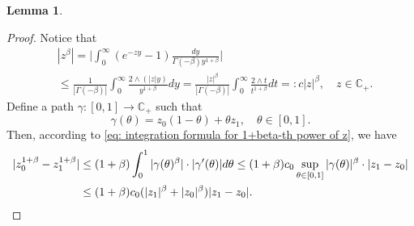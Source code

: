 \documentclass[12pt,oneside,english]{amsart}
\theoremstyle{plain}
\newtheorem{lem}[thm]{Lemma}
\theoremstyle{definition}
\numberwithin{equation}{section}
\begin{document}
{\begin{lem}
\end{lem}
\begin{proof}
    Notice that
\begin{align}
\label{eq: upper bound for beta power of z}
    &|z^{\beta}|
    = \Big|\int_0^\infty (e^{-zy}-1) \frac{dy}{\Gamma(-\beta)y^{1+\beta}}\Big|
    \\&\leq \frac{1}{|\Gamma(-\beta)|}\int_0^\infty \frac{2\wedge (|z|y)}{y^{1+\beta}}dy
    = \frac{|z|^{\beta}}{|\Gamma(-\beta)|}\int_0^\infty \frac{2\wedge t}{t^{1+\beta}}dt =: c |z|^{\beta},
    \quad z\in \mathbb C_+.
\end{align}
    Define a path $\gamma: [0,1] \to \mathbb C_+$ such that
\[
    \gamma(\theta)
    = z_0 (1-\theta) + \theta z_1,
    \quad \theta \in [0,1].
\]
    Then, according to \eqref{eq: integration formula for 1+beta-th power of z}, we have
\begin{align}
    |z_0^{1+\beta} - z_1^{1+\beta}|
    &\leq (1+\beta) \int_0^1 |\gamma(\theta)^{\beta}|\cdot |\gamma'(\theta)|d\theta
    \leq (1+\beta) c_0 \sup_{\theta \in [0,1]} |\gamma(\theta)|^{\beta} \cdot |z_1-z_0|
    \\&\leq (1+\beta) c_0 ( |z_1|^{\beta}+|z_0|^{\beta} ) |z_1-z_0|.
    \qedhere
\end{align}
\end{proof}
}
\end{document}
